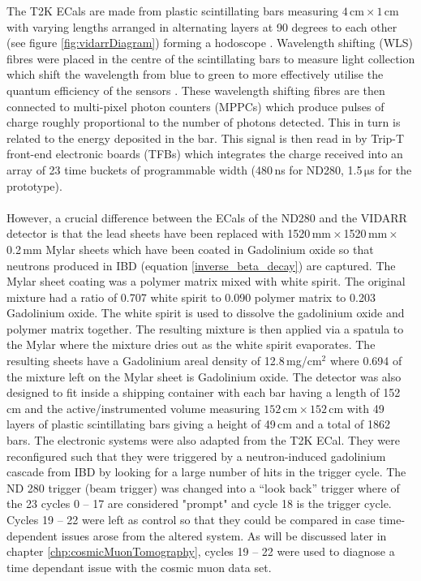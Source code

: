 The T2K ECals are made from plastic scintillating bars measuring $4\,\textrm{cm}\times1\,\textrm{cm}$ with varying lengths arranged in alternating layers at 90 degrees to each other (see figure \ref{fig:vidarrDiagram}) forming a hodoscope \cite{Allan_2013}. Wavelength shifting (WLS) fibres were placed in the centre of the scintillating bars to measure light collection which shift the wavelength from blue to green to more effectively utilise the quantum efficiency of the sensors \cite{Allan_2013}. These wavelength shifting fibres are then connected to multi-pixel photon counters (MPPCs) which produce pulses of charge roughly proportional to the number of photons detected. This in turn is related to the energy deposited in the bar. This signal is then read in by Trip-T front-end electronic boards (TFBs) which integrates the charge received into an array of 23 time buckets of programmable width (480\,ns for ND280, 1.5\,$\mathrm{\mu}$s for the prototype). 
\\\\However, a crucial difference between the ECals of the ND280 and the VIDARR detector is that the lead sheets have been replaced with 1520\,mm\,$\times$\,1520\,mm\,$\times$\,0.2\,mm Mylar sheets which have been coated in Gadolinium oxide so that  neutrons produced in IBD (equation \ref{inverse_beta_decay}) are captured. The Mylar sheet coating was a polymer matrix mixed with white spirit. The original mixture had a ratio of 0.707 white spirit to 0.090 polymer matrix to 0.203 Gadolinium oxide. The white spirit is used to dissolve the gadolinium oxide and polymer matrix together. The resulting mixture is then applied via a spatula to the Mylar where the mixture dries out as the white spirit evaporates. The resulting sheets have a Gadolinium areal density of 12.8\,mg/cm$^2$ where 0.694 of the mixture left on the Mylar sheet is Gadolinium oxide. The detector was also designed to fit inside a shipping container with each bar having a length of 152\,cm and the active/instrumented volume measuring $152\,\textrm{cm}\times152\,\textrm{cm}$ with 49 layers of plastic scintillating bars giving a height of 49\,cm and a total of 1862 bars. The electronic systems were also adapted from the T2K ECal. They were reconfigured such that they were triggered by a neutron-induced gadolinium cascade from IBD by looking for a large number of hits in the trigger cycle. The ND 280 trigger (beam trigger) was changed into a ``look back'' trigger where of the 23 cycles 0 -- 17 are considered "prompt" and cycle 18 is the trigger cycle. Cycles 19 -- 22 were left as control so that they could be compared in case time-dependent issues arose from the altered system. As will be discussed later in chapter \ref{chp:cosmicMuonTomography}, cycles 19 -- 22 were used to diagnose a time dependant issue with the cosmic muon data set.

